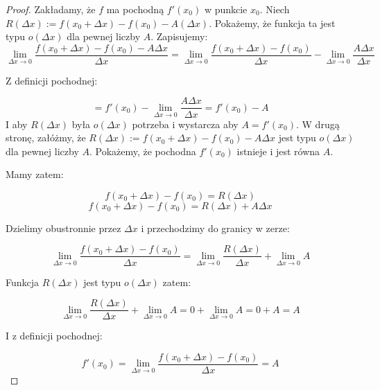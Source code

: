 \documentclass{article}
\begin{document}
\begin{proof}
    Zakładamy, że \(f\) ma pochodną \(f'(x_0)\) w punkcie \(x_0\). 
    Niech \(R(\Delta x) := f(x_0 + \Delta x) - f(x_0) - A(\Delta x)\). Pokażemy, że funkcja ta jest typu \(o(\Delta x)\) dla pewnej liczby \(A\).
    Zapisujemy:
    \begin{equation*}
        \lim_{\Delta x \to 0} \frac{f(x_0 + \Delta x) - f(x_0) - A \Delta x}{\Delta x} = \lim_{\Delta x \to 0} \frac{f(x_0 + \Delta x) - f(x_0)}{\Delta x} - \lim_{\Delta x \to 0} \frac{A \Delta x}{\Delta x}
    \end{equation*}

    Z definicji pochodnej:

    \begin{equation*}
        = f'(x_{0}) - \lim_{\Delta x \to 0} \frac{A \Delta x}{\Delta x} = f'(x_{0}) - A 
    \end{equation*}
    I aby \(R(\Delta x)\) była \(o(\Delta x)\) potrzeba i wystarcza aby \(A = f'(x_{0})\).
    \newline
    W drugą stronę, załóżmy, że \(R(\Delta x) := f(x_0 + \Delta x) - f(x_0) - A \Delta x \) jest typu \(o(\Delta x)\) dla pewnej liczby \(A\). Pokażemy, że pochodna \(f'(x_{0})\) istnieje i jest równa \(A\).


    Mamy zatem:

    \begin{equation*}
        f(x_0 + \Delta x) - f(x_0)  = R(\Delta x)
    \end{equation*}
    \begin{equation*}
        f(x_0 + \Delta x) - f(x_0) = R(\Delta x) + A \Delta x
    \end{equation*}

    Dzielimy obustronnie przez \(\Delta x\) i przechodzimy do granicy w zerze:

    \begin{equation*}
        \lim_{\Delta x \to 0} \frac{f(x_0 + \Delta x) - f(x_0)}{\Delta x} = \lim_{\Delta x \to 0} \frac{R(\Delta x)}{\Delta x} +  \lim_{\Delta x \to 0} A
    \end{equation*}

    Funkcja \(R(\Delta x)\) jest typu \(o(\Delta x)\) zatem:

    \begin{equation*}
        \lim_{\Delta x \to 0} \frac{R(\Delta x)}{\Delta x} +  \lim_{\Delta x \to 0} A = 0 + \lim_{\Delta x \to 0} A = 0 + A = A
    \end{equation*}

    I z definicji pochodnej:

    \begin{equation*}
        f'(x_{0}) = \lim_{\Delta x \to 0} \frac{f(x_0 + \Delta x) - f(x_0)}{\Delta x} = A
    \end{equation*}
\end{proof}
\end{document}
